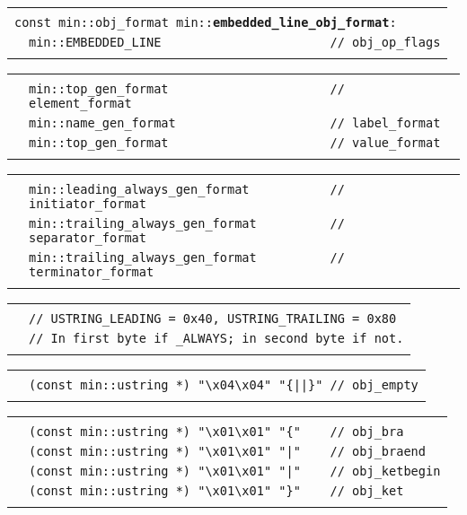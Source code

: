 \documentclass[12pt]{article}
\makeatletter
\newcommand{\TT}[1]{{\tt \bfseries #1}}
\newcommand{\ttindex}[1]{\index{#1@{\tt #1}}}
\newenvironment{indpar}[1][0.3in]%
	{\begin{list}{}%
		     {\setlength{\itemsep}{0in}%
		      \setlength{\topsep}{0in}%
		      \setlength{\parsep}{1ex}%
		      \setlength{\labelwidth}{#1}%
		      \setlength{\leftmargin}{#1}%
		      \addtolength{\leftmargin}{\labelsep}}%
	 \item}%
	{\end{list}}
\newcommand{\LABEL}[1]{\label{#1}}
\newlength{\ARGBREAKLENGTH}
\newcommand{\ARGBREAK}[1][\ARGBREAKLENGTH]{\\&\hspace*{#1}}
\newcommand{\MINKEY}[1]%
	   {\TT{#1}\ttindex{min::#1}\ttindex{#1}}
\makeatother
\begin{document}
\begin{indpar}[1em]
\begin{tabular}{r@{}l}\hspace*{0.1in} \\[-3ex]
\multicolumn{2}{l}{\tt const min::obj\_format
                   min::\MINKEY{embedded\_line\_obj\_format}:}%
\LABEL{MIN::EMBEDDED_LINE_OBJ_FORMAT}\ARGBREAK
\verb|min::EMBEDDED_LINE                       // obj_op_flags|\ARGBREAK
\end{tabular}

\vspace{-4ex}\begin{tabular}{r@{}l}\hspace*{0.1in}\ARGBREAK
\verb|min::top_gen_format                      // element_format|\ARGBREAK
\verb|min::name_gen_format                     // label_format|\ARGBREAK
\verb|min::top_gen_format                      // value_format|\ARGBREAK
\end{tabular}

\vspace{-4ex}\begin{tabular}{r@{}l}\hspace*{0.1in}\ARGBREAK
\verb|min::leading_always_gen_format           // initiator_format|\ARGBREAK
\verb|min::trailing_always_gen_format          // separator_format|\ARGBREAK
\verb|min::trailing_always_gen_format          // terminator_format|\ARGBREAK
\end{tabular}

\vspace{-4ex}\begin{tabular}{r@{}l}\hspace*{0.1in}\ARGBREAK
\verb|// USTRING_LEADING = 0x40, USTRING_TRAILING = 0x80|\ARGBREAK
\verb|// In first byte if _ALWAYS; in second byte if not.|\ARGBREAK
\end{tabular}

\vspace{-4ex}\begin{tabular}{r@{}l}\hspace*{0.1in}\ARGBREAK
\verb$(const min::ustring *) "\x04\x04" "{||}" // obj_empty$\ARGBREAK
\end{tabular}

\vspace{-4ex}\begin{tabular}{r@{}l}\hspace*{0.1in}\ARGBREAK
\verb|(const min::ustring *) "\x01\x01" "{"    // obj_bra|\ARGBREAK
\verb$(const min::ustring *) "\x01\x01" "|"    // obj_braend$\ARGBREAK
\verb$(const min::ustring *) "\x01\x01" "|"    // obj_ketbegin$\ARGBREAK
\verb|(const min::ustring *) "\x01\x01" "}"    // obj_ket|\ARGBREAK
\end{tabular}


\end{indpar}
\end{document}
